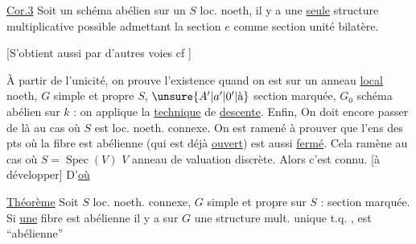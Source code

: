 \uline{Cor.3} Soit un schéma abélien sur un $S$ loc. noeth, il y a une \uline{seule} structure multiplicative possible admettant la section $e$ comme section unité bilatère.

[S'obtient aussi par d'autres voies  cf \unsure{\textemdash}]

À partir de l'unicité, on prouve l'existence quand on est sur un anneau \uline{local} noeth, $G$ simple et propre $S$, $\unsure{A'|a'|0'|\text{à}}$ section marquée, $G_0$ schéma abélien sur $k$ : on applique la \uline{technique} de \uline{descente}. Enfin, On doit encore passer de là au cas où $S$ est loc. noeth. connexe. On est ramené à prouver que l'ens des pts où la fibre est abélienne (qui est déjà \uline{ouvert}) est aussi \uline{fermé}. Cela ramène au cas où $S=\operatorname{Spec}(V)$ $V$ anneau de valuation discrète. Alors c'est connu.  [à développer] D'\uline{où}

\uline{Théorème} Soit $S$ loc. noeth. connexe, $G$ simple et propre sur $S$ : section marquée. Si \uline{une} fibre est abélienne il y a sur $G$ une structure mult. unique t.q.  ,  est ``abélienne''
